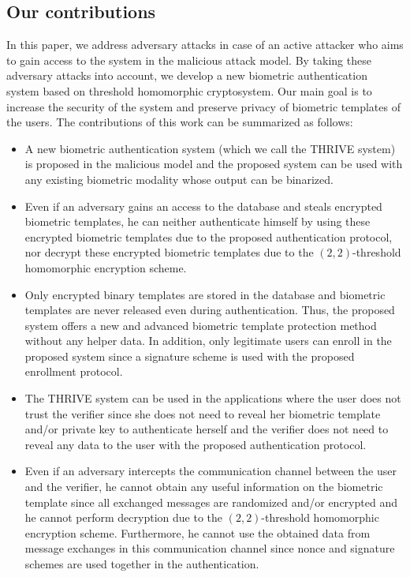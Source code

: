 \documentclass[journal]{IEEEtran}
\begin{document}
\subsection{Our contributions}

In this paper, we address adversary attacks in case of an active attacker who aims to gain access to the system in the malicious attack model. By taking these adversary attacks into account, we develop a new biometric authentication system based on threshold homomorphic cryptosystem. Our main goal is to increase the security of the system and preserve privacy of biometric templates of the users. The contributions of this work can be summarized as follows:

\begin{itemize}
\item A new biometric authentication system (which we call the THRIVE system) is proposed in the malicious model and the proposed system can be used with any existing biometric modality whose output can be binarized. 

\item Even if an adversary gains an access to the database and steals encrypted biometric templates,  he can neither authenticate himself by using these encrypted biometric templates due to the proposed authentication protocol, nor decrypt these encrypted biometric templates due to the $(2,2)$-threshold homomorphic encryption scheme. 

\item Only encrypted binary templates are stored in the database and biometric templates are never released even during authentication. Thus, the proposed system offers a new and advanced biometric template protection method without any helper data. In addition, only legitimate users can enroll in the proposed system since a signature scheme is used with the proposed enrollment protocol.

\item The THRIVE system can be used in the applications where the user does not trust the verifier since she does not need to reveal her biometric template and/or private key to authenticate herself and  the verifier does not need to reveal any data to the user with the proposed authentication protocol. 

\item Even if an adversary intercepts the communication channel between the user and the verifier, he cannot obtain any useful information on the biometric template since all exchanged messages are randomized and/or encrypted and he cannot perform decryption due to the $(2,2)$-threshold homomorphic encryption scheme. Furthermore, he cannot use the obtained data from message exchanges in this communication channel since nonce and signature schemes are used together in the authentication.


\end{itemize}
\end{document}
